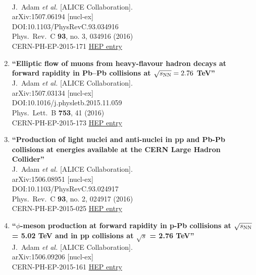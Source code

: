 \begin{enumerate}
  \\{}J.~Adam {\it et al.} [ALICE Collaboration].
  \\{}arXiv:1507.06194 [nucl-ex]
  \\{}DOI:10.1103/PhysRevC.93.034916
  \\{}Phys.\ Rev.\ C {\bf 93}, no. 3, 034916 (2016)
  \\{}CERN-PH-EP-2015-171
\href{http://inspirehep.net/record/1384270}{HEP entry}
\item%
{\bf ``Elliptic flow of muons from heavy-flavour hadron decays at forward rapidity in Pb–Pb collisions at $\sqrt{s_{\rm NN}}= 2.76$ TeV''}
  \\{}J.~Adam {\it et al.} [ALICE Collaboration].
  \\{}arXiv:1507.03134 [nucl-ex]
  \\{}DOI:10.1016/j.physletb.2015.11.059
  \\{}Phys.\ Lett.\ B {\bf 753}, 41 (2016)
  \\{}CERN-PH-EP-2015-173
\href{http://inspirehep.net/record/1382591}{HEP entry}
\item%
{\bf ``Production of light nuclei and anti-nuclei in pp and Pb-Pb collisions at energies available at the CERN Large Hadron Collider''}
  \\{}J.~Adam {\it et al.} [ALICE Collaboration].
  \\{}arXiv:1506.08951 [nucl-ex]
  \\{}DOI:10.1103/PhysRevC.93.024917
  \\{}Phys.\ Rev.\ C {\bf 93}, no. 2, 024917 (2016)
  \\{}CERN-PH-EP-2015-025
\href{http://inspirehep.net/record/1380491}{HEP entry}
\item%
{\bf ``$\phi$-meson production at forward rapidity in p-Pb collisions at $\sqrt{s_{\rm NN}}$ = 5.02 TeV and in pp collisions at $\sqrt{s}$ = 2.76 TeV''}
  \\{}J.~Adam {\it et al.} [ALICE Collaboration].
  \\{}arXiv:1506.09206 [nucl-ex]
  \\{}CERN-PH-EP-2015-161
\href{http://inspirehep.net/record/1380453}{HEP entry}

\end{enumerate}
